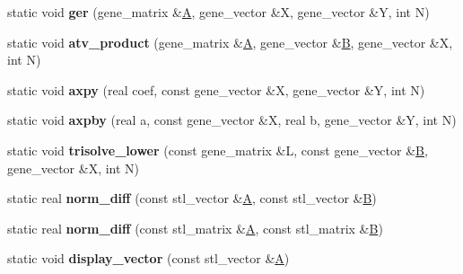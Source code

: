 \begin{DoxyCompactItemize}
static void {\bfseries ger} (gene\+\_\+matrix \&\hyperlink{group___core___module_class_eigen_1_1_matrix}{A}, gene\+\_\+vector \&X, gene\+\_\+vector \&Y, int N)
\item 
\mbox{\label{class_s_t_l__interface_a2c4ecb839106736405210ddd48b87f11}} 
static void {\bfseries atv\+\_\+product} (gene\+\_\+matrix \&\hyperlink{group___core___module_class_eigen_1_1_matrix}{A}, gene\+\_\+vector \&\hyperlink{group___core___module_class_eigen_1_1_matrix}{B}, gene\+\_\+vector \&X, int N)
\item 
\mbox{\label{class_s_t_l__interface_a030f479aada0f19121fbb78bbd8e5ece}} 
static void {\bfseries axpy} (real coef, const gene\+\_\+vector \&X, gene\+\_\+vector \&Y, int N)
\item 
\mbox{\label{class_s_t_l__interface_a952aa772e33d8d3f0517b57bd59bb6ab}} 
static void {\bfseries axpby} (real a, const gene\+\_\+vector \&X, real b, gene\+\_\+vector \&Y, int N)
\item 
\mbox{\label{class_s_t_l__interface_a37c93e4cdf74080795a47180894f53bb}} 
static void {\bfseries trisolve\+\_\+lower} (const gene\+\_\+matrix \&L, const gene\+\_\+vector \&\hyperlink{group___core___module_class_eigen_1_1_matrix}{B}, gene\+\_\+vector \&X, int N)
\item 
\mbox{\label{class_s_t_l__interface_ae22df884fd2657f82119665d11ba07e4}} 
static real {\bfseries norm\+\_\+diff} (const stl\+\_\+vector \&\hyperlink{group___core___module_class_eigen_1_1_matrix}{A}, const stl\+\_\+vector \&\hyperlink{group___core___module_class_eigen_1_1_matrix}{B})
\item 
\mbox{\label{class_s_t_l__interface_a50dcee48c1ae9dbfe67fc7bfb816a394}} 
static real {\bfseries norm\+\_\+diff} (const stl\+\_\+matrix \&\hyperlink{group___core___module_class_eigen_1_1_matrix}{A}, const stl\+\_\+matrix \&\hyperlink{group___core___module_class_eigen_1_1_matrix}{B})
\item 
\mbox{\label{class_s_t_l__interface_a60aad273027a15a9df65a512cc9b0527}} 
static void {\bfseries display\+\_\+vector} (const stl\+\_\+vector \&\hyperlink{group___core___module_class_eigen_1_1_matrix}{A})

\end{DoxyCompactItemize}
